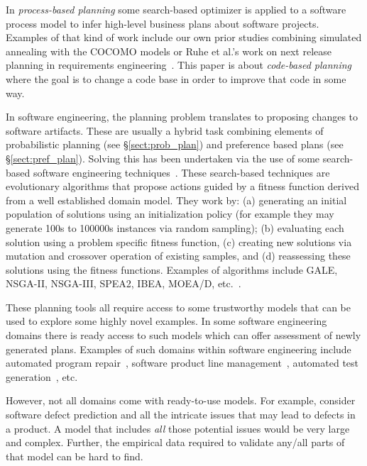 \documentclass[10pt,journal,compsoc]{IEEEtran}
\newcommand{\tion}[1]{\S\ref{sect:#1}}
\begin{document}
In {\em process-based planning} some search-based optimizer is applied to a software process model to infer high-level business plans about software projects. Examples of that kind of work include our own prior studies combining simulated annealing with the COCOMO models or Ruhe et al.'s work on next release planning in requirements engineering~\cite{ruhe2003quantitative, ruhe2010product}. This paper is about {\em code-based planning} where the goal is to change a code base in order to improve that code in some way.

In software engineering, the planning problem translates to proposing changes to software artifacts. These are usually a hybrid task combining elements of probabilistic planning (see \tion{prob_plan}) and preference based plans (see \tion{pref_plan}). Solving this has been undertaken via the use of some search-based software engineering techniques~\cite{Harman2009, Harman2011}. These search-based techniques are evolutionary algorithms that propose actions guided by a fitness function derived from a well established domain model. They work by: (a) generating an initial population of solutions using an initialization policy (for example they may generate 100s to 100000s instances via random sampling); (b) evaluating each solution using a problem specific fitness function, (c) creating new solutions via mutation and crossover operation of existing samples, and (d) reassessing these solutions using the fitness functions. Examples of algorithms include GALE, NSGA-II, NSGA-III, SPEA2, IBEA, MOEA/D, etc.~\cite{krall2015gale,deb00a,zit02,zit04, deb14,Cui2005a,zhang07:TEC}. 
 
These planning tools all require access to some trustworthy models that can be used to explore some highly novel examples. In some software engineering domains there is ready access to such models which can offer assessment of newly generated plans. Examples of such domains within software engineering include automated program repair~\cite{Weimer2009, Forrest2009, Goues12, Schulte2010, LeGoues2015}, software product line management~\cite{clements2002software, sayyad13, metzger14, henard15}, automated test generation~\cite{me09m,andrews07,andrews10}, etc.  

However, not all domains come with ready-to-use models. For example, consider software defect prediction and all the intricate issues that may lead to defects in a product. A model that includes {\em all} those potential issues would be very large and complex. Further, the empirical data required to validate any/all parts of that model can be hard to find.
\end{document}
